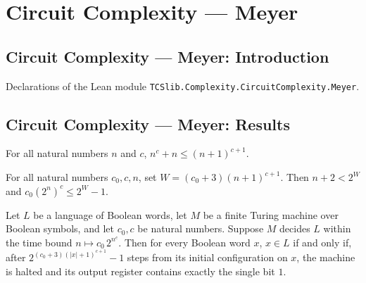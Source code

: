 \section{Circuit Complexity --- Meyer}
\subsection*{Circuit Complexity --- Meyer: Introduction}

Declarations of the Lean module \texttt{TCSlib.Complexity.CircuitComplexity.Meyer}.

\subsection*{Circuit Complexity --- Meyer: Results}

\begin{theorem}
\label{Complexity.Meyer.pow_succ_ge}
\leanok
{}
For all natural numbers $n$ and $c$, $n^c+n\le (n+1)^{c+1}$.
\end{theorem}

\begin{theorem}
\label{Complexity.Meyer.width_ok}
\leanok
{}
For all natural numbers $c_0,c,n$, set $W=(c_0+3)(n+1)^{c+1}$. Then $n+2<2^W$ and
$c_0(2^n)^c\le 2^W-1$.
\end{theorem}

\begin{theorem}
\label{Complexity.Meyer.mem_iff_final}
\leanok
{}
Let $L$ be a language of Boolean words, let $M$ be a finite Turing machine over Boolean
symbols, and let $c_0,c$ be natural numbers. Suppose $M$ decides $L$ within the time
bound $n\mapsto c_0\,2^{n^c}$. Then for every Boolean word $x$, $x\in L$ if and only if,
after $2^{(c_0+3)(|x|+1)^{c+1}}-1$ steps from its initial configuration on $x$, the
machine is halted and its output register contains exactly the single bit $1$.
\end{theorem}

